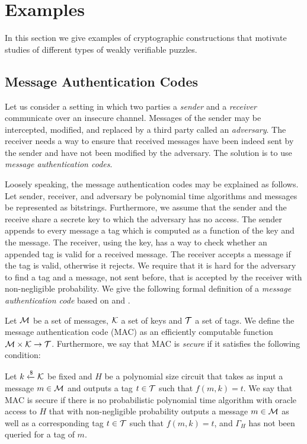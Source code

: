 \section{Examples}
\label{section:wvp_examples}
In this section we give examples of cryptographic constructions that motivate studies of different types of weakly verifiable puzzles.

\subsection{Message Authentication Codes}
Let us consider a setting in which two parties a \textit{sender} and a \textit{receiver} communicate over an insecure channel.
Messages of the sender may be intercepted, modified, and replaced by a third party called an \textit{adversary}.
The receiver needs a way to ensure that received messages have been indeed sent by the sender and have not been modified by the adversary.
The solution is to use \textit{message authentication codes}.

Loosely speaking, the message authentication codes may be explained as follows.
Let sender, receiver, and adversary be polynomial time algorithms and messages be represented as bitstrings.
Furthermore, we assume that the sender and the receive share a secrete key to which the adversary has no access.
The sender appends to every message a tag which is computed as a function of the key and the message.
The receiver, using the key, has a way to check whether an appended tag is valid for a received message.
The receiver accepts a message if the tag is valid, otherwise it rejects.
We require that it is hard for the adversary to find a tag and a message, not sent before, that is accepted by the receiver with non-negligible probability.
We give the following formal definition of a \textit{message authentication code} based on \cite{LectureNotesCrypo} and \cite{Goldreich:2004:FCV:975541}.
\begin{definition}
  \label{def:mac}
  Let $\mathcal{M}$ be a set of messages, $\mathcal{K}$ a set of keys and $\mathcal{T}$ a set of tags.
  We define the \textnormal{message authentication code (MAC)} as an efficiently computable function $\mathcal{M} \times \mathcal{K} \rightarrow \mathcal{T}$.
  Furthermore, we say that MAC is \textit{secure} if it satisfies the following condition:

  Let $k \xleftarrow{\$} \mathcal{K}$ be fixed and $H$ be a polynomial size circuit that takes as input a message $m \in \mathcal{M}$ and outputs a tag $t \in \mathcal{T}$
  such that $f(m,k) = t$. We say that MAC is secure if there is no probabilistic polynomial time algorithm
  with oracle access to $H$ that with non-negligible probability outputs a message $m \in \mathcal{M}$
  as well as a corresponding tag $t \in \mathcal{T}$ such that $f(m, k) = t$, and $\Gamma_H$ has not been queried for a tag of $m$.
\end{definition}

